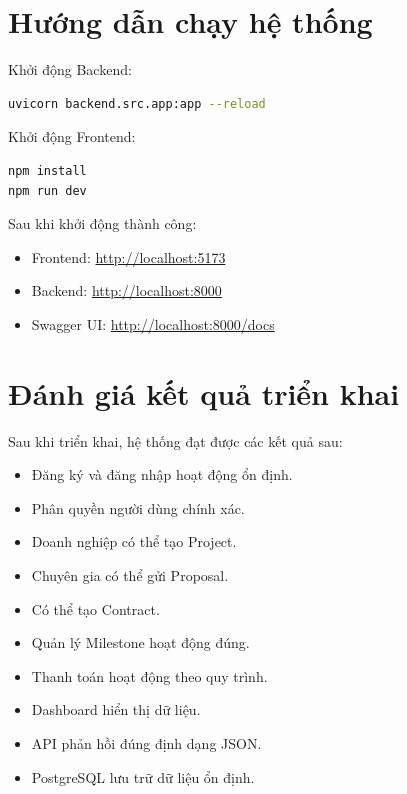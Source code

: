 
\section{Hướng dẫn chạy hệ thống}

Khởi động Backend:

\begin{lstlisting}[language=bash]
uvicorn backend.src.app:app --reload
\end{lstlisting}

Khởi động Frontend:

\begin{lstlisting}[language=bash]
npm install
npm run dev
\end{lstlisting}

Sau khi khởi động thành công:

\begin{itemize}

\item Frontend:
\url{http://localhost:5173}

\item Backend:
\url{http://localhost:8000}

\item Swagger UI:
\url{http://localhost:8000/docs}

\end{itemize}


\section{Đánh giá kết quả triển khai}

Sau khi triển khai, hệ thống đạt được các kết quả sau:

\begin{itemize}

\item Đăng ký và đăng nhập hoạt động ổn định.

\item Phân quyền người dùng chính xác.

\item Doanh nghiệp có thể tạo Project.

\item Chuyên gia có thể gửi Proposal.

\item Có thể tạo Contract.

\item Quản lý Milestone hoạt động đúng.

\item Thanh toán hoạt động theo quy trình.

\item Dashboard hiển thị dữ liệu.

\item API phản hồi đúng định dạng JSON.

\item PostgreSQL lưu trữ dữ liệu ổn định.

\end{itemize}

